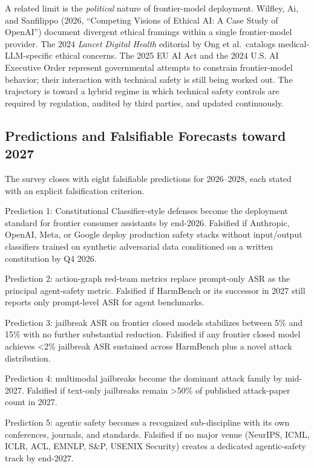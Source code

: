A related limit is the \emph{political} nature of frontier-model deployment. Wilfley, Ai, and Sanfilippo (2026, ``Competing Visions of Ethical AI: A Case Study of OpenAI'') document divergent ethical framings within a single frontier-model provider. The 2024 \emph{Lancet Digital Health} editorial by Ong et al.~catalogs medical-LLM-specific ethical concerns. The 2025 EU AI Act and the 2024 U.S. AI Executive Order represent governmental attempts to constrain frontier-model behavior; their interaction with technical safety is still being worked out. The trajectory is toward a hybrid regime in which technical safety controls are required by regulation, audited by third parties, and updated continuously.

\subsection{Predictions and Falsifiable Forecasts toward 2027}\label{predictions-and-falsifiable-forecasts-toward-2027}

The survey closes with eight falsifiable predictions for 2026--2028, each stated with an explicit falsification criterion.

Prediction 1: Constitutional Classifier-style defenses become the deployment standard for frontier consumer assistants by end-2026. Falsified if Anthropic, OpenAI, Meta, or Google deploy production safety stacks without input/output classifiers trained on synthetic adversarial data conditioned on a written constitution by Q4 2026.

Prediction 2: action-graph red-team metrics replace prompt-only ASR as the principal agent-safety metric. Falsified if HarmBench or its successor in 2027 still reports only prompt-level ASR for agent benchmarks.

Prediction 3: jailbreak ASR on frontier closed models stabilizes between 5\% and 15\% with no further substantial reduction. Falsified if any frontier closed model achieves \textless2\% jailbreak ASR sustained across HarmBench plus a novel attack distribution.

Prediction 4: multimodal jailbreaks become the dominant attack family by mid-2027. Falsified if text-only jailbreaks remain \textgreater50\% of published attack-paper count in 2027.

Prediction 5: agentic safety becomes a recognized sub-discipline with its own conferences, journals, and standards. Falsified if no major venue (NeurIPS, ICML, ICLR, ACL, EMNLP, S\&P, USENIX Security) creates a dedicated agentic-safety track by end-2027.

